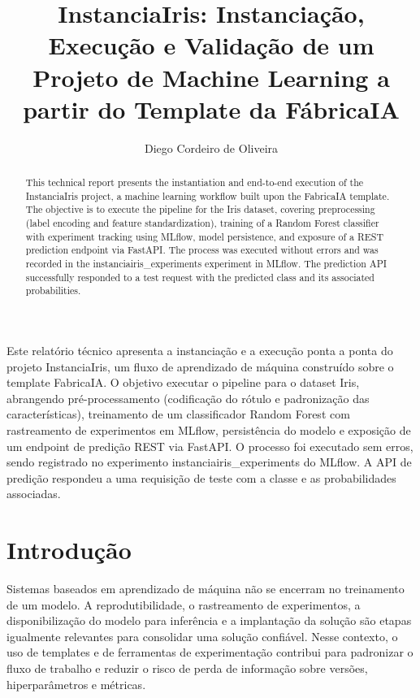 \documentclass[12pt]{article}
\title{InstanciaIris: Instanciação, Execução e Validação de um Projeto de Machine Learning a 
partir do Template da FábricaIA}
\author{Diego Cordeiro de Oliveira\inst{1}}
\begin{document}
\maketitle

\begin{abstract}
This technical report presents the instantiation and end-to-end execution of the InstanciaIris project, 
a machine learning workflow built upon the FabricaIA template. The objective is to execute the pipeline 
for the Iris dataset, covering preprocessing (label encoding and feature standardization), training of a 
Random Forest classifier with experiment tracking using MLflow, model persistence, and exposure of a REST 
prediction endpoint via FastAPI. The process was executed without errors and was recorded in the instanciairis\_experiments experiment in MLflow.
The prediction API successfully responded to a test request with the predicted class and its associated probabilities.
\end{abstract}

\begin{resumo}
Este relatório técnico apresenta a instanciação e a execução ponta a ponta do projeto InstanciaIris,
um fluxo de aprendizado de máquina construído sobre o template FabricaIA. O objetivo executar
o pipeline para o dataset Iris, abrangendo pré-processamento (codificação do rótulo e
padronização das características), treinamento de um classificador Random Forest com rastreamento de
experimentos em MLflow, persistência do modelo e exposição de um endpoint de predição REST via FastAPI.
O processo foi executado sem erros, sendo registrado no experimento instanciairis\_experiments do
MLflow. A API de predição respondeu a uma requisição de teste com a classe e as probabilidades
associadas.
\end{resumo}

\section{Introdução}
Sistemas baseados em aprendizado de máquina não se encerram no treinamento de um modelo. A reprodutibilidade,
o rastreamento de experimentos, a disponibilização do modelo para inferência e a implantação da solução são etapas igualmente
relevantes para consolidar uma solução confiável. Nesse contexto, o uso de templates e de ferramentas de
experimentação contribui para padronizar o fluxo de trabalho e reduzir o risco de perda de informação
sobre versões, hiperparâmetros e métricas.
\end{document}
